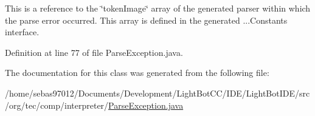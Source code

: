 This is a reference to the \char`\"{}token\+Image\char`\"{} array of the generated parser within which the parse error occurred. This array is defined in the generated ...Constants interface. 

Definition at line 77 of file Parse\+Exception.\+java.



The documentation for this class was generated from the following file\+:\begin{DoxyCompactItemize}
\item 
/home/sebas97012/\+Documents/\+Development/\+Light\+Bot\+C\+C/\+I\+D\+E/\+Light\+Bot\+I\+D\+E/src/org/tec/comp/interpreter/\mbox{\hyperlink{_parse_exception_8java}{Parse\+Exception.\+java}}\end{DoxyCompactItemize}
